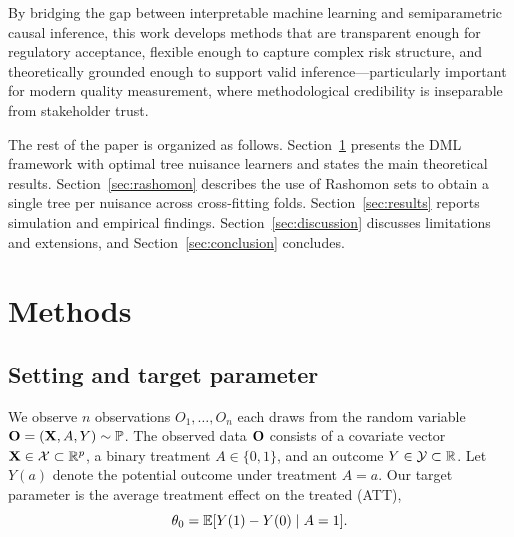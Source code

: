 \documentclass[12pt]{article}
\begin{document}
By bridging the gap between interpretable machine learning and semiparametric causal inference, this work develops methods that are transparent enough for regulatory acceptance, flexible enough to capture complex risk structure, and theoretically grounded enough to support valid inference---particularly important for modern quality measurement, where methodological credibility is inseparable from stakeholder trust.

The rest of the paper is organized as follows. Section~\ref{sec:methods} presents the DML framework with optimal tree nuisance learners and states the main theoretical results. Section~\ref{sec:rashomon} describes the use of Rashomon sets to obtain a single tree per nuisance across cross-fitting folds. Section~\ref{sec:results} reports simulation and empirical findings. Section~\ref{sec:discussion} discusses limitations and extensions, and Section~\ref{sec:conclusion} concludes.

\section{Methods}
\label{sec:methods}

\subsection{Setting and target parameter}

We observe $n$ observations $O_1, \ldots, O_n$ each \iid draws from the random variable $\mathbf{O} = (\mathbf{X}, A, Y) \sim \mathbb{P}$. The observed data $\mathbf{O}$ consists of a covariate vector $\mathbf{X} \in \mathcal{X} \subset \mathbb{R}^p$, a binary treatment $A \in \{0,1\}$, and an outcome $Y \in \mathcal{Y} \subset \mathbb{R}$. Let $Y(a)$ denote the potential outcome under treatment $A = a$. Our target parameter is the average treatment effect on the treated (ATT),
\begin{equation}
\label{eq:att}
\theta_0 = \mathbb{E}[Y(1) - Y(0) \mid A=1].
\end{equation}
\end{document}
